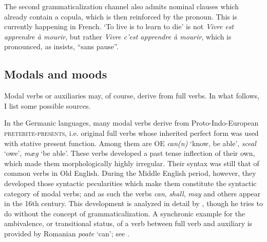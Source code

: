 The second grammaticalization channel also admits nominal clauses which already contain a copula, which is then reinforced by the pronoun. This is currently happening in French. ‘To live is to learn to die’ is not \textit{Vivre est apprendre à mourir}, but rather \textit{Vivre c'est apprendre à mourir}, which is pronounced, as \citet[72]{Frei1929} insists, “sans pause”.

\subsection{Modals and moods}\label{sec:3.1.3}

Modal verbs or auxiliaries may, of course, derive from full verbs. In what follows, I list some possible sources.

\label{page30}In the Germanic languages, many modal verbs derive from Proto-Indo-\linebreak European \textsc{preterite-presents}, i.e. original full verbs whose inherited perfect form was used with stative present function. Among them are OE \textit{can(n)} ‘know, be able’, \textit{sceal} ‘owe’, \textit{mæg} ‘be able’. These verbs developed a past tense inflection of their own, which made them morphologically highly irregular. Their syntax was still that of common verbs in Old English. During the Middle English period, however, they developed those syntactic pecularities which make them constitute the syntactic category of modal verbs; and as such the verbs \textit{can}, \textit{shall}, \textit{may} and others appear in the 16th century. This development is analyzed in detail by \citet[98ff]{Lightfoot1979}, though he tries to do without the concept of grammaticalization. A synchronic example for the ambivalence, or transitional status, of a verb between full verb and auxiliary is provided by Romanian \textit{poate} ‘can’; see \citet[198f]{MallinsonEtAl1981}.

